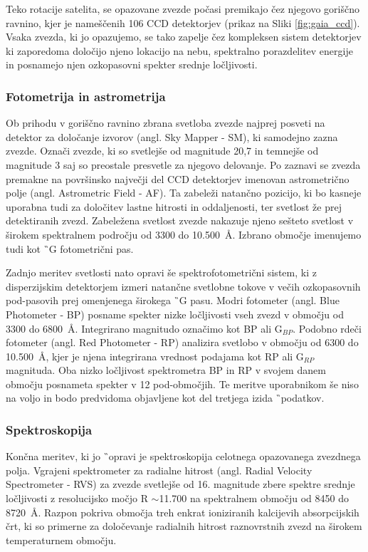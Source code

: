 Teko rotacije satelita, se opazovane zvezde počasi premikajo čez njegovo goriščno ravnino, kjer je nameščenih 106 CCD detektorjev (prikaz na Sliki \ref{fig:gaia_ccd}). Vsaka zvezda, ki jo opazujemo, se tako zapelje čez kompleksen sistem detektorjev ki zaporedoma določijo njeno lokacijo na nebu, spektralno porazdelitev energije in posnamejo njen ozkopasovni spekter srednje ločljivosti.

\subsubsection{Fotometrija in astrometrija}
Ob prihodu v goriščno ravnino zbrana svetloba zvezde najprej posveti na detektor za določanje izvorov (angl. Sky Mapper - SM), ki samodejno zazna zvezde. Označi zvezde, ki so svetlejše od magnitude 20,7 in temnejše od magnitude 3 saj so preostale presvetle za njegovo delovanje. Po zaznavi se zvezda premakne na površinsko največji del CCD detektorjev imenovan astrometrično polje (angl. Astrometric Field - AF). Ta zabeleži natančno pozicijo, ki bo kasneje uporabna tudi za določitev lastne hitrosti in oddaljenosti, ter svetlost že prej detektiranih zvezd. Zabeležena svetlost zvezde nakazuje njeno sešteto svetlost v širokem spektralnem področju od 3300 do 10.500~\AA. Izbrano območje imenujemo tudi kot \G\ G fotometrični pas.

Zadnjo meritev svetlosti nato opravi še spektrofotometrični sistem, ki z disperzijskim detektorjem izmeri natančne svetlobne tokove v večih ozkopasovnih pod-pasovih prej omenjenega širokega \G\ G pasu. Modri fotometer (angl. Blue Photometer - BP) posname spekter nizke ločljivosti vseh zvezd v območju od 3300 do 6800~\AA. Integrirano magnitudo označimo kot BP ali G$_{BP}$. Podobno rdeči fotometer (angl. Red Photometer - RP) analizira svetlobo v območju od 6300 do 10.500~\AA, kjer je njena integrirana vrednost podajama kot RP ali G$_{RP}$ magnituda. Oba nizko ločljivost spektrometra BP in RP v svojem danem območju posnameta spekter v 12 pod-območjih. Te meritve uporabnikom še niso na voljo in bodo predvidoma objavljene kot del tretjega izida \G\ podatkov.

\subsubsection{Spektroskopija}
Končna meritev, ki jo \G\ opravi je spektroskopija celotnega opazovanega zvezdnega polja. Vgrajeni spektrometer za radialne hitrost (angl. Radial Velocity Spectrometer - RVS) za zvezde svetlejše od 16. magnitude zbere spektre srednje ločljivosti z resolucijsko močjo R $\sim$11.700 na spektralnem območju od 8450 do 8720~\AA. Razpon pokriva območja treh enkrat ioniziranih kalcijevih absorpcijskih črt, ki so primerne za določevanje radialnih hitrost raznovrstnih zvezd na širokem temperaturnem območju.

